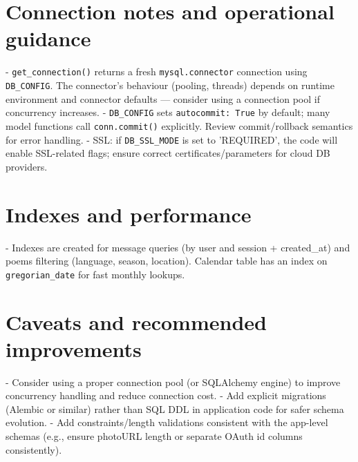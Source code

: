 \section*{Connection notes and operational guidance}
- \texttt{get\_connection()} returns a fresh \texttt{mysql.connector} connection using \texttt{DB\_CONFIG}. The connector's behaviour (pooling, threads) depends on runtime environment and connector defaults — consider using a connection pool if concurrency increases.
- \texttt{DB\_CONFIG} sets \texttt{autocommit: True} by default; many model functions call \texttt{conn.commit()} explicitly. Review commit/rollback semantics for error handling.
- SSL: if \texttt{DB\_SSL\_MODE} is set to 'REQUIRED', the code will enable SSL-related flags; ensure correct certificates/parameters for cloud DB providers.

\section*{Indexes and performance}
- Indexes are created for message queries (by user and session + created\_at) and poems filtering (language, season, location). Calendar table has an index on \texttt{gregorian\_date} for fast monthly lookups.

\section*{Caveats and recommended improvements}
- Consider using a proper connection pool (or SQLAlchemy engine) to improve concurrency handling and reduce connection cost.
- Add explicit migrations (Alembic or similar) rather than SQL DDL in application code for safer schema evolution.
- Add constraints/length validations consistent with the app-level schemas (e.g., ensure photoURL length or separate OAuth id columns consistently).

